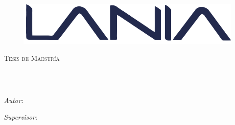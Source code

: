 \documentclass[
12pt, %
spanish, %
singlespacing, %
headsepline, %
]{MastersDoctoralThesis} %
\author{Ing. Roides Javier \textsc{Cruz Lara}} %
\theoremstyle{plain}
\theoremstyle{definition}
\begin{document}
\frontmatter %

\pagestyle{plain} %


\begin{titlepage}
\begin{center}
		\vspace*{-1in}	
			
			\begin{figure}[htb]
			\begin{center}
			\includegraphics[width=0.6\linewidth]{Figures/logolania}
			\end{center}
			\end{figure}
         
{\scshape\LARGE \univname\par}\vspace{2.5cm} %
\textsc{\Large Tesis de Maestría}\\[0.5cm] %

\HRule \\[0.4cm] %
{\huge \bfseries \ttitle\par}\vspace{0.4cm} %
\HRule \\[1.5cm] %
 
\begin{minipage}[t]{0.4\textwidth}
\begin{flushleft} \large
\emph{Autor:}\\
\href{https://roydes.github.io/about/}{\authorname} %
\end{flushleft}
\end{minipage}
\begin{minipage}[t]{0.4\textwidth}
\begin{flushright} \large
\emph{Supervisor:} \\
\href{https://www.uv.mx/personal/emezura/}{\supname} %
\end{flushright}
\end{minipage}\\[3cm]
 

\end{center}
\end{titlepage}
\end{document}
